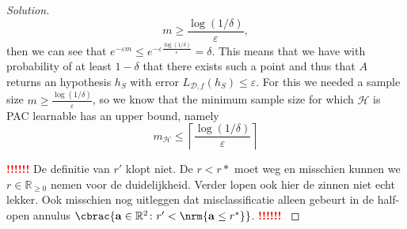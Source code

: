 \documentclass[10pt, a4paper, twoside]{amsart}
\newcommand{\R}{\ensuremath{\mathbb{R}}}
\DeclarePairedDelimiter\cbrac\{\}
\DeclarePairedDelimiter{\nrm}\lVert\rVert
\renewcommand{\c}{\ensuremath{\colon}}
\newenvironment{solution}
               {\let\oldqedsymbol=\qedsymbol
                \renewcommand{\qedsymbol}{$\blacktriangleleft$}
                \begin{proof}[Solution]}
               {\end{proof}
                \renewcommand{\qedsymbol}{\oldqedsymbol}}
\newcommand{\TODO}{\textcolor{red}{\textbf{!!!!!! }}}
\begin{document}
\begin{solution}
\begin{equation*}
  m \geq \frac{\log(1/\delta)}{\varepsilon},
\end{equation*}
then we can see that $e^{-\varepsilon m} \leq e^{-\varepsilon \frac{\log(1/\delta)}{\varepsilon}} = \delta$. This means that we have with probability of at least $1- \delta$ that there exists such a point and thus that $A$ returns an hypothesis $h_S$ with error $L_{\mathcal{D},f}(h_S) \leq \varepsilon$. For this we needed a sample size $m \geq \frac{\log(1/\delta)}{\varepsilon}$, so we know that the minimum sample size for which $\mathcal{H}$ is PAC learnable has an upper bound, namely 
  \begin{equation*}
    m_{\mathcal{H}}\leq \left\lceil \frac{\log(1/\delta )}{\varepsilon} \right\rceil
  \end{equation*}
  
  \TODO De definitie van $r'$ klopt niet. De $r < r*$ moet weg en misschien kunnen we $r \in \R_{\geq 0}$ nemen voor de duidelijkheid. 
  Verder lopen ook hier de zinnen niet echt lekker. 
  Ook misschien nog uitleggen dat misclassificatie alleen gebeurt in de half-open annulus 
  $\cbrac{\mathbf{a} \in \R^2 \c r'<\nrm{\mathbf{a}\leq r^*}}$. \TODO
\end{solution}
\end{document}
